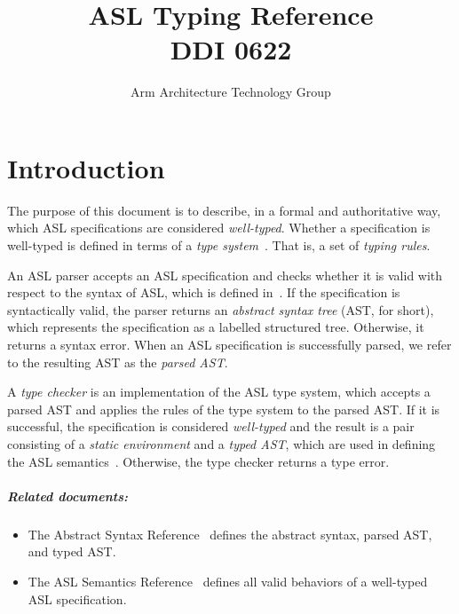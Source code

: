 \documentclass{book}
\author{Arm Architecture Technology Group}
\title{ASL Typing Reference \\
       DDI 0622}
\begin{document}
\maketitle

\tableofcontents{}





\chapter{Introduction}

The purpose of this document is to describe, in a formal and authoritative way,
which ASL specifications are considered \emph{well-typed}.
Whether a specification is well-typed is defined in terms of a \emph{type system}~\cite{TypeSystemsLucaCardelli}.
That is, a set of \emph{typing rules}.

An ASL parser accepts an ASL specification and checks whether it is valid with respect to the syntax of ASL,
which is defined in~\cite{ASLAbstractSyntaxReference}.
If the specification is syntactically valid, the parser returns an \emph{abstract syntax tree} (AST, for short),
which represents the specification as a labelled structured tree. Otherwise, it returns a syntax error.
When an ASL specification is successfully parsed, we refer to the resulting AST as the \emph{parsed AST}.

A \emph{type checker} is an implementation of the ASL type system, which accepts a parsed AST and applies the
rules of the type system to the parsed AST. If it is successful, the specification
is considered \emph{well-typed} and the result is a pair consisting of
a \emph{static environment} and a \emph{typed AST}, which are used in defining the ASL semantics~\cite{ASLSemanticsReference}.
Otherwise, the type checker returns a type error.

\paragraph{Related documents:}
\begin{itemize}
  \item The Abstract Syntax Reference~\cite{ASLAbstractSyntaxReference} defines the abstract syntax, parsed AST, and typed AST.
  \item The ASL Semantics Reference~\cite{ASLSemanticsReference} defines all valid behaviors of a well-typed ASL specification.
\end{itemize}
\end{document}
